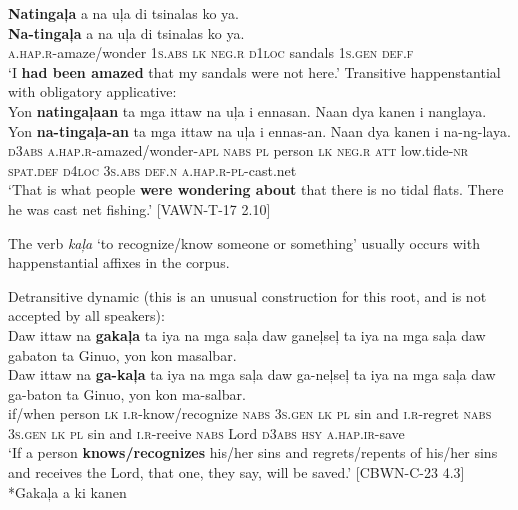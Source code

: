 \ea
\textbf{Natingaļa}  a  na  uļa  di  tsinalas  ko  ya. \\\smallskip
\gll \textbf{Na-tingaļa}  a  na  uļa  di  tsinalas  ko  ya. \\
\textsc{a.hap.r}-amaze/wonder  1\textsc{s.abs}  \textsc{lk}  \textsc{neg.r}  \textsc{d1loc}  sandals  1\textsc{s.gen}  \textsc{def.f} \\
\glt `I \textbf{had been amazed} that my sandals were not here.’
\z
\ea
Transitive happenstantial with obligatory applicative: \\
Yon  \textbf{natingaļaan}  ta  mga  ittaw  na  uļa  i ennasan. Naan  dya  kanen  i  nanglaya.\\\smallskip
\gll Yon  \textbf{na-tingaļa-an}  ta  mga  ittaw  na  uļa  i ennas-an. Naan  dya  kanen  i  na-ng-laya.\\
\textsc{d3abs}  \textsc{a.hap.r}-amazed/wonder-\textsc{apl}  \textsc{nabs}  \textsc{pl}  person  \textsc{lk}  \textsc{neg.r}  \textsc{att}
low.tide-\textsc{nr}
\textsc{spat.def}  \textsc{d4loc}  3\textsc{s.abs}  \textsc{def.n}  \textsc{a.hap.r}-\textsc{pl}-cast.net \\
\glt `That is what people \textbf{were wondering about} that there is no tidal flats. There he was cast net fishing.’ [VAWN-T-17 2.10]
\z

\largerpage
The verb \textit{kaļa} ‘to recognize/know someone or something’ usually occurs with happenstantial affixes in the corpus.

\ea
Detransitive dynamic (this is an unusual construction for this root, and is not accepted by all speakers): \\
Daw  ittaw  na  \textbf{gakaļa}  ta  iya  na  mga  saļa  daw  ganeļseļ ta  iya  na  mga  saļa  daw  gabaton  ta  Ginuo,  yon  kon  masalbar. \\\smallskip
\gll Daw  ittaw  na  \textbf{ga-kaļa}  ta  iya  na  mga  saļa  daw  ga-neļseļ ta  iya  na  mga  saļa  daw  ga-baton  ta  Ginuo,  yon  kon  ma-salbar. \\
if/when  person  \textsc{lk}  \textsc{i.r}-know/recognize  \textsc{nabs}  3\textsc{s.gen}  \textsc{lk}  \textsc{pl}  sin  and  \textsc{i.r}-regret
\textsc{nabs}  3\textsc{s.gen}  \textsc{lk}  \textsc{pl}  sin  and  \textsc{i.r}-reeive  \textsc{nabs}  Lord  \textsc{d3abs}  \textsc{hsy}  \textsc{a.hap.ir}-save \\
\glt `If a person \textbf{knows/recognizes} his/her sins and regrets/repents of his/her sins and receives the Lord, that one, they say, will be saved.’ [CBWN-C-23 4.3] \\\smallskip
*Gakaļa a ki kanen
\zlast\clearpage

